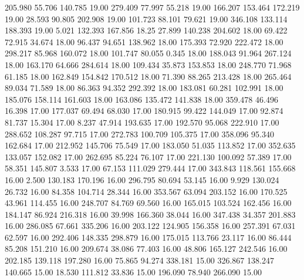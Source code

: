  205.980   55.706  140.785        19.00
 279.409   77.997   55.218        19.00
 166.207  153.464  172.219        19.00
  28.593   90.805  202.908        19.00
 101.723   88.101   79.621        19.00
 346.108  133.114  188.393        19.00
   5.021  132.393  167.856        18.25
  27.899  140.238  204.602        18.00
  69.422   72.915   34.674        18.00
  96.437   94.651  138.962        18.00
 175.393   72.920  222.472        18.00
 298.217   85.968  160.072        18.00
 101.747   80.055    0.345        18.00
 188.043   91.964  267.124        18.00
 163.170   64.666  284.614        18.00
 109.434   35.873  153.853        18.00
 248.770   71.968   61.185        18.00
 162.849  154.842  170.512        18.00
  71.390   88.265  213.428        18.00
 265.464   89.034   71.589        18.00
  86.363   94.352  292.392        18.00
 183.081   60.281  102.991        18.00
 185.076  158.114  161.603        18.00
 163.086  135.472  141.838        18.00
 359.478   46.496   16.398        17.00
 177.037   69.494   68.030        17.00
 180.915   99.422  144.049        17.00
  92.874   81.737   15.304        17.00
   8.237   47.914  193.635        17.00
 192.570   95.068  222.910        17.00
 288.652  108.287   97.715        17.00
 272.783  100.709  105.375        17.00
 358.096   95.340  162.684        17.00
 212.952  145.706   75.549        17.00
 183.050   51.035  113.852        17.00
 352.635  133.057  152.082        17.00
 262.695   85.224   76.107        17.00
 221.130  100.092   57.389        17.00
  58.351  145.807    3.533        17.00
  67.153  111.029  279.444        17.00
 343.843  118.561  155.668        16.00
   2.500  130.183  170.196        16.00
 296.795   80.694   53.145        16.00
   9.929  130.024   26.732        16.00
  84.358  104.714   28.344        16.00
 353.567   63.094  203.152        16.00
 170.525   43.961  114.455        16.00
 248.707   84.769   69.560        16.00
 165.015  103.524  162.456        16.00
 184.147   86.924  216.318        16.00
  39.998  166.360   38.044        16.00
 347.438   34.357  201.883        16.00
 286.085   67.661  335.206        16.00
 203.122  124.905  156.358        16.00
 257.391   67.031   62.597        16.00
 292.406  148.335  298.879        16.00
 175.015  113.766   23.117        16.00
  86.444   85.208  151.210        16.00
 209.674   38.086   77.403        16.00
  48.806  165.127  242.546        16.00
 202.185  139.118  197.280        16.00
  75.865   94.274  338.181        15.00
 326.867  138.247  140.665        15.00
  18.530  111.812   33.836        15.00
 196.090   78.940  266.090        15.00
